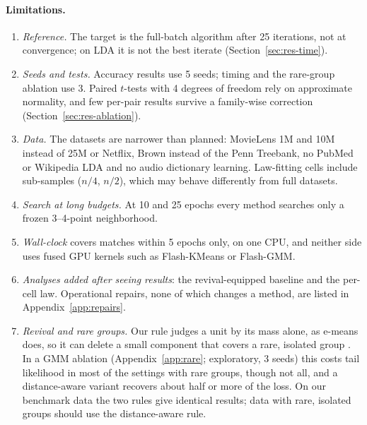 \documentclass[10pt]{article}
\begin{document}
\paragraph{Limitations.}
\begin{enumerate}[nosep]
  \item \emph{Reference.} The target is the full-batch algorithm after 25 iterations, not at convergence; on LDA it is
        not the best iterate (Section~\ref{sec:res-time}).
  \item \emph{Seeds and tests.} Accuracy results use 5 seeds; timing and the rare-group ablation use 3. Paired
        $t$-tests with 4 degrees of freedom rely on approximate normality, and few per-pair results survive a
        family-wise correction (Section~\ref{sec:res-ablation}).
  \item \emph{Data.} The datasets are narrower than planned: MovieLens 1M and 10M instead of 25M or Netflix, Brown
        instead of the Penn Treebank, no PubMed or Wikipedia LDA and no audio dictionary learning. Law-fitting cells
        include sub-samples ($n/4$, $n/2$), which may behave differently from full datasets.
  \item \emph{Search at long budgets.} At 10 and 25 epochs every method searches only a frozen 3--4-point
        neighborhood.
  \item \emph{Wall-clock} covers matches within 5 epochs only, on one CPU, and neither side uses fused GPU kernels
        such as Flash-KMeans or Flash-GMM.
  \item \emph{Analyses added after seeing results}: the revival-equipped baseline and the per-cell law. Operational
        repairs, none of which changes a method, are listed in Appendix~\ref{app:repairs}.
  \item \emph{Revival and rare groups.} Our rule judges a unit by its mass alone, as e-means does, so it can delete a
        small component that covers a rare, isolated group
        \citep{weiss2026small,assylbekov2026counterexamples,tiwari2026fuzzy}. In a GMM ablation
        (Appendix~\ref{app:rare}; exploratory, 3 seeds) this costs tail likelihood in most of the settings with rare
        groups, though not all, and a distance-aware variant recovers about half or more of the loss. On our benchmark data the two rules give identical results; data with
        rare, isolated groups should use the distance-aware rule.
\end{enumerate}

\end{document}
